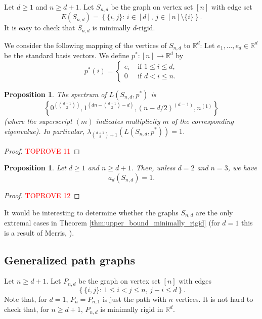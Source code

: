 \documentclass[a4paper,11pt]{article}
\theoremstyle{plain}
\newtheorem{proposition}[theorem]{\bf Proposition}
\theoremstyle{definition}
\newcommand{\Rea}{{\mathbb R}}
\newcommand{\px}{p^*}
\begin{document}
Let $d\geq 1$ and $n\geq d+1$. Let $S_{n,d}$ be the graph on vertex set $[n]$ with edge set
\[
    E(S_{n,d})=\left\{ \{i,j\}:\, i\in[d],\,  j\in[n]\setminus\{i\}\right\}.
\]
It is easy to check that $S_{n,d}$ is minimally $d$-rigid. 

We consider the following mapping of the vertices of $S_{n,d}$ to $\Rea^d$:
Let $e_1,\ldots,e_d\in \Rea^d$ be the standard basis vectors. We define $\px:[n]\to \Rea^d$ by
\[
    \px(i)=\begin{cases}
        e_i & \text{ if } 1\leq i\leq d,\\
        0 & \text{ if } d<i\leq n.
    \end{cases}
\]

\begin{proposition}\label{claim:star_spectrum}
The spectrum of $L(S_{n,d},\px)$ is
\[
\left\{ 0^{\left(\binom{d+1}{2}\right)}, 1^{\left(dn-\binom{d+1}{2}-d\right)}, (n-d/2)^{(d-1)}, n^{(1)} \right\}
\]
(where the superscript $(m)$ indicates multiplicity $m$ of the corresponding eigenvalue).
In particular, $\lambda_{{\binom{d+1}{2}+1}}(L(S_{n,d},\px))= 1$.
\end{proposition}
\begin{proof}\textcolor{red}{TOPROVE 11}\end{proof}


\begin{proposition}\label{prop:lower_bound_star_graph}
Let $d\geq 1$ and $n\geq d+1$. Then, unless $d=2$ and $n=3$, we have
\[
    a_d(S_{n,d})=1.
\]
\end{proposition}
\begin{proof}\textcolor{red}{TOPROVE 12}\end{proof}

It would be interesting to determine whether the graphs $S_{n,d}$ are the only extremal cases in Theorem \ref{thm:upper_bound_minimally_rigid} (for $d=1$ this is a result of Merris, \cite[Cor. 2]{merris1987characteristic}).



\subsection{Generalized path graphs}\label{subsec:GeneralizedPathGraphs}

Let $n\geq d+1$. Let $P_{n,d}$ be the graph on vertex set $[n]$ with edges \[\left\{ \{i,j\} :\,1\leq i<j\leq n,\,  j-i\leq d\right\}.\] Note that, for $d=1$, $P_n=P_{n,1}$ is just the path with $n$ vertices.
It is not hard to check that, for $n\geq d+1$, $P_{n,d}$ is minimally rigid in $\Rea^d$.
\end{document}
